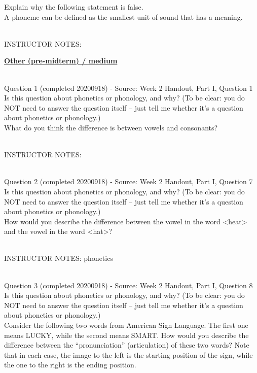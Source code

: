 \documentclass[12pt]{article}
\begin{document}
Explain why the following statement is false.\\

A phoneme can be defined as the smallest unit of sound that has a meaning.


~\\
INSTRUCTOR NOTES: 


\newpage\textbf{\underline{\huge Other (pre-midterm) / medium\\}}

~\\

{\large Question 1} (completed 20200918) - Source: Week 2 Handout, Part I, Question 1\\

Is this question about phonetics or phonology, and why? (To be clear: you do NOT need to answer the question itself -- just tell me whether it's a question about phonetics or phonology.)\\

What do you think the difference is between vowels and consonants?


~\\
INSTRUCTOR NOTES: 


~\\

{\large Question 2} (completed 20200918) - Source: Week 2 Handout, Part I, Question 7\\

Is this question about phonetics or phonology, and why? (To be clear: you do NOT need to answer the question itself -- just tell me whether it's a question about phonetics or phonology.)\\

How would you describe the difference between the vowel in the word <heat> and the vowel in the word <hat>?


~\\
INSTRUCTOR NOTES: phonetics


~\\

{\large Question 3} (completed 20200918) - Source: Week 2 Handout, Part I, Question 8\\

Is this question about phonetics or phonology, and why? (To be clear: you do NOT need to answer the question itself -- just tell me whether it's a question about phonetics or phonology.)\\

Consider the following two words from American Sign Language. The first one means LUCKY, while the second means SMART. How would you describe the difference between the ``pronunciation'' (articulation) of these two words? Note that in each case, the image to the left is the starting position of the sign, while the one to the right is the ending position.
\end{document}
